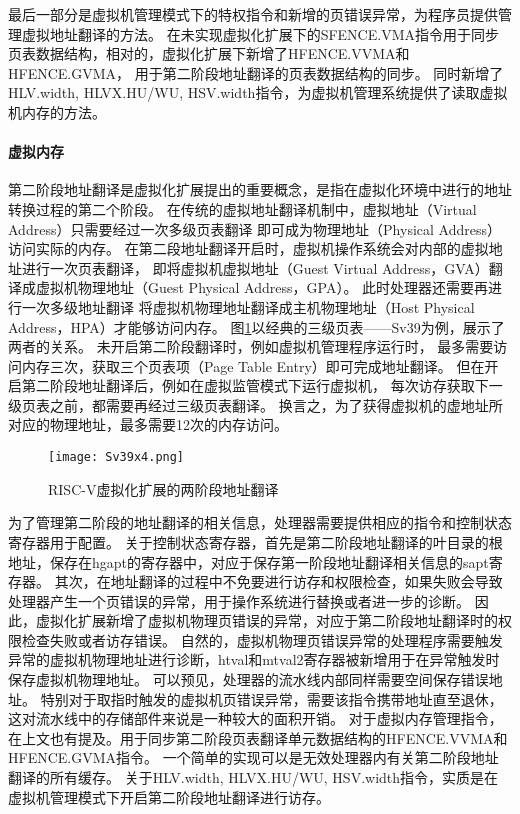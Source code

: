 最后一部分是虚拟机管理模式下的特权指令和新增的页错误异常，为程序员提供管理虚拟地址翻译的方法。
在未实现虚拟化扩展下的SFENCE.VMA指令用于同步页表数据结构，相对的，虚拟化扩展下新增了HFENCE.VVMA和HFENCE.GVMA，
用于第二阶段地址翻译的页表数据结构的同步。
同时新增了HLV.width, HLVX.HU/WU, HSV.width指令，为虚拟机管理系统提供了读取虚拟机内存的方法。

\paragraph{虚拟内存}
第二阶段地址翻译是虚拟化扩展提出的重要概念，是指在虚拟化环境中进行的地址转换过程的第二个阶段。
在传统的虚拟地址翻译机制中，虚拟地址（Virtual Address）只需要经过一次多级页表翻译
即可成为物理地址（Physical Address）访问实际的内存。
在第二段地址翻译开启时，虚拟机操作系统会对内部的虚拟地址进行一次页表翻译，
即将虚拟机虚拟地址（Guest Virtual Address，GVA）翻译成虚拟机物理地址（Guest Physical Address，GPA）。
此时处理器还需要再进行一次多级地址翻译
将虚拟机物理地址翻译成主机物理地址（Host Physical Address，HPA）才能够访问内存。
图\ref*{fig:Sv39x4}以经典的三级页表——Sv39为例，展示了两者的关系。
未开启第二阶段翻译时，例如虚拟机管理程序运行时，
最多需要访问内存三次，获取三个页表项（Page Table Entry）即可完成地址翻译。
但在开启第二阶段地址翻译后，例如在虚拟监管模式下运行虚拟机，
每次访存获取下一级页表之前，都需要再经过三级页表翻译。
换言之，为了获得虚拟机的虚地址所对应的物理地址，最多需要12次的内存访问。

\begin{figure}[htbp]
    \centering
    \texttt{[image: Sv39x4.png]}
    \caption{RISC-V虚拟化扩展的两阶段地址翻译}
    \label{fig:Sv39x4}
\end{figure}

为了管理第二阶段的地址翻译的相关信息，处理器需要提供相应的指令和控制状态寄存器用于配置。
关于控制状态寄存器，首先是第二阶段地址翻译的叶目录的根地址，保存在hgapt的寄存器中，对应于保存第一阶段地址翻译相关信息的sapt寄存器。
其次，在地址翻译的过程中不免要进行访存和权限检查，如果失败会导致处理器产生一个页错误的异常，用于操作系统进行替换或者进一步的诊断。
因此，虚拟化扩展新增了虚拟机物理页错误的异常，对应于第二阶段地址翻译时的权限检查失败或者访存错误。
自然的，虚拟机物理页错误异常的处理程序需要触发异常的虚拟机物理地址进行诊断，htval和mtval2寄存器被新增用于在异常触发时保存虚拟机物理地址。
可以预见，处理器的流水线内部同样需要空间保存错误地址。
特别对于取指时触发的虚拟机页错误异常，需要该指令携带地址直至退休，这对流水线中的存储部件来说是一种较大的面积开销。
对于虚拟内存管理指令，在上文也有提及。用于同步第二阶段页表翻译单元数据结构的HFENCE.VVMA和HFENCE.GVMA指令。
一个简单的实现可以是无效处理器内有关第二阶段地址翻译的所有缓存。
关于HLV.width, HLVX.HU/WU, HSV.width指令，实质是在虚拟机管理模式下开启第二阶段地址翻译进行访存。

